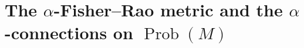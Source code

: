 \documentclass[11pt,reqno]{amsart}
\theoremstyle{definition}
\newcommand{\Prob}{\operatorname{Prob}(M)}
\begin{document}







\section{The $\alpha$-Fisher--Rao metric and the $\alpha$-connections on $\Prob$}\label{sec:prob}
\end{document}
